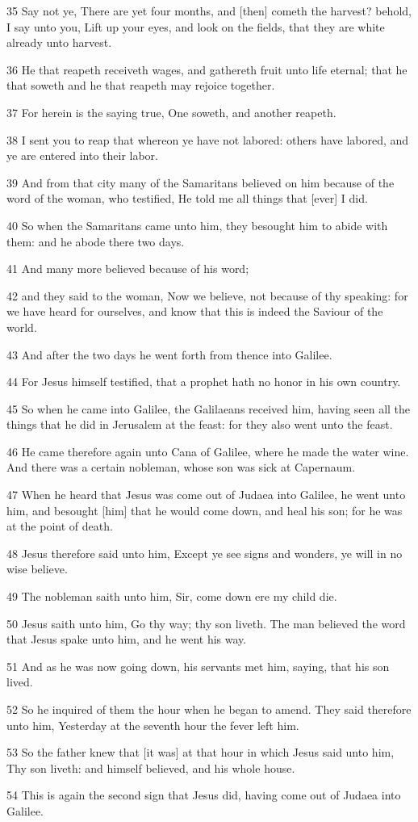 \par 35 Say not ye, There are yet four months, and [then] cometh the harvest? behold, I say unto you, Lift up your eyes, and look on the fields, that they are white already unto harvest.
\par 36 He that reapeth receiveth wages, and gathereth fruit unto life eternal; that he that soweth and he that reapeth may rejoice together.
\par 37 For herein is the saying true, One soweth, and another reapeth.
\par 38 I sent you to reap that whereon ye have not labored: others have labored, and ye are entered into their labor.
\par 39 And from that city many of the Samaritans believed on him because of the word of the woman, who testified, He told me all things that [ever] I did.
\par 40 So when the Samaritans came unto him, they besought him to abide with them: and he abode there two days.
\par 41 And many more believed because of his word;
\par 42 and they said to the woman, Now we believe, not because of thy speaking: for we have heard for ourselves, and know that this is indeed the Saviour of the world.
\par 43 And after the two days he went forth from thence into Galilee.
\par 44 For Jesus himself testified, that a prophet hath no honor in his own country.
\par 45 So when he came into Galilee, the Galilaeans received him, having seen all the things that he did in Jerusalem at the feast: for they also went unto the feast.
\par 46 He came therefore again unto Cana of Galilee, where he made the water wine. And there was a certain nobleman, whose son was sick at Capernaum.
\par 47 When he heard that Jesus was come out of Judaea into Galilee, he went unto him, and besought [him] that he would come down, and heal his son; for he was at the point of death.
\par 48 Jesus therefore said unto him, Except ye see signs and wonders, ye will in no wise believe.
\par 49 The nobleman saith unto him, Sir, come down ere my child die.
\par 50 Jesus saith unto him, Go thy way; thy son liveth. The man believed the word that Jesus spake unto him, and he went his way.
\par 51 And as he was now going down, his servants met him, saying, that his son lived.
\par 52 So he inquired of them the hour when he began to amend. They said therefore unto him, Yesterday at the seventh hour the fever left him.
\par 53 So the father knew that [it was] at that hour in which Jesus said unto him, Thy son liveth: and himself believed, and his whole house.
\par 54 This is again the second sign that Jesus did, having come out of Judaea into Galilee.

